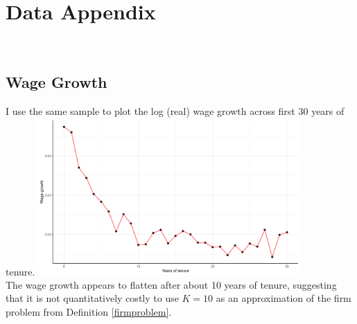 \section{Data Appendix}
\
\subsection{Wage Growth} \label{wagegrowthK}
I use the same sample to plot the log (real) wage growth across first 30 years of tenure. 
\includegraphics[width=0.75\textwidth]{Wage growth across tenure under 30,cutoff 100.jpg} \\
The wage growth appears to flatten after about 10 years of tenure, suggesting that it is not quantitatively costly to use $K=10$ as an approximation of the firm problem from Definition \ref{firmproblem}.

